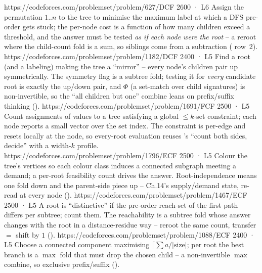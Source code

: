 \begin{mixedset}
    {https://codeforces.com/problemset/problem/627/D}{CF 2600 · L6}
    {Assign the permutation $1..n$ to the tree to minimise the maximum label at which a DFS pre-order gets stuck; the per-node cost is a function of how many children exceed a threshold, and the answer must be tested \emph{as if each node were the root} -- a reroot where the child-count fold is a sum, so siblings come from a subtraction ( row~2).}
    {https://codeforces.com/problemset/problem/1182/D}{CF 2400 · L5}
    {Find a root (and a labeling) making the tree a ``mirror'' -- every node's children pair up symmetrically. The symmetry flag is a subtree fold; testing it for \emph{every} candidate root is exactly the up/down pair, and $\Phi$ (a set-match over child signatures) is non-invertible, so the ``all children but one'' combine leans on prefix/suffix thinking ().}
    {https://codeforces.com/problemset/problem/1691/F}{CF 2500 · L5}
    {Count assignments of values to a tree satisfying a global $\le k$-set constraint; each node reports a small vector over the set index. The constraint is per-edge and resets locally at the node, so every-root evaluation reuses 's ``count both sides, decide'' with a width-$k$ profile.}
    {https://codeforces.com/problemset/problem/1796/E}{CF 2500 · L5}
    {Colour the tree's vertices so each colour class induces a connected subgraph meeting a demand; a per-root feasibility count drives the answer. Root-independence means one fold down and the parent-side piece up -- Ch.14's supply/demand state, re-read at every node ().}
    {https://codeforces.com/problemset/problem/1467/E}{CF 2500 · L5}
    {A root is ``distinctive'' if the pre-order reach-set of the first path differs per subtree; count them. The reachability is a subtree fold whose answer changes with the root in a distance-residue way -- reroot the same count, transfer $=$ shift by $1$ ().}
    {https://codeforces.com/problemset/problem/1088/E}{CF 2400 · L5}
    {Choose a connected component maximising $\lceil \sum a / \rvert\text{size}\rvert$; per root the best branch is a $\max$ fold that must drop the chosen child -- a non-invertible $\max$ combine, so exclusive prefix/suffix ().}

\end{mixedset}
